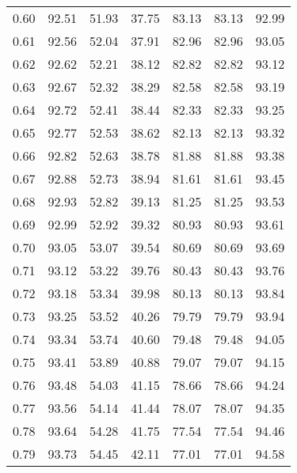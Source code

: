 \begin{tabular}{|c|c|c|c|c|c|c|}
      0.60 &     92.51 &     51.93 &      37.75 &   83.13 &      83.13 &         92.99 \\
      0.61 &     92.56 &     52.04 &      37.91 &   82.96 &      82.96 &         93.05 \\
      0.62 &     92.62 &     52.21 &      38.12 &   82.82 &      82.82 &         93.12 \\
      0.63 &     92.67 &     52.32 &      38.29 &   82.58 &      82.58 &         93.19 \\
      0.64 &     92.72 &     52.41 &      38.44 &   82.33 &      82.33 &         93.25 \\
      0.65 &     92.77 &     52.53 &      38.62 &   82.13 &      82.13 &         93.32 \\
      0.66 &     92.82 &     52.63 &      38.78 &   81.88 &      81.88 &         93.38 \\
      0.67 &     92.88 &     52.73 &      38.94 &   81.61 &      81.61 &         93.45 \\
      0.68 &     92.93 &     52.82 &      39.13 &   81.25 &      81.25 &         93.53 \\
      0.69 &     92.99 &     52.92 &      39.32 &   80.93 &      80.93 &         93.61 \\
      0.70 &     93.05 &     53.07 &      39.54 &   80.69 &      80.69 &         93.69 \\
      0.71 &     93.12 &     53.22 &      39.76 &   80.43 &      80.43 &         93.76 \\
      0.72 &     93.18 &     53.34 &      39.98 &   80.13 &      80.13 &         93.84 \\
      0.73 &     93.25 &     53.52 &      40.26 &   79.79 &      79.79 &         93.94 \\
      0.74 &     93.34 &     53.74 &      40.60 &   79.48 &      79.48 &         94.05 \\
      0.75 &     93.41 &     53.89 &      40.88 &   79.07 &      79.07 &         94.15 \\
      0.76 &     93.48 &     54.03 &      41.15 &   78.66 &      78.66 &         94.24 \\
      0.77 &     93.56 &     54.14 &      41.44 &   78.07 &      78.07 &         94.35 \\
      0.78 &     93.64 &     54.28 &      41.75 &   77.54 &      77.54 &         94.46 \\
      0.79 &     93.73 &     54.45 &      42.11 &   77.01 &      77.01 &         94.58 \\

\end{tabular}
